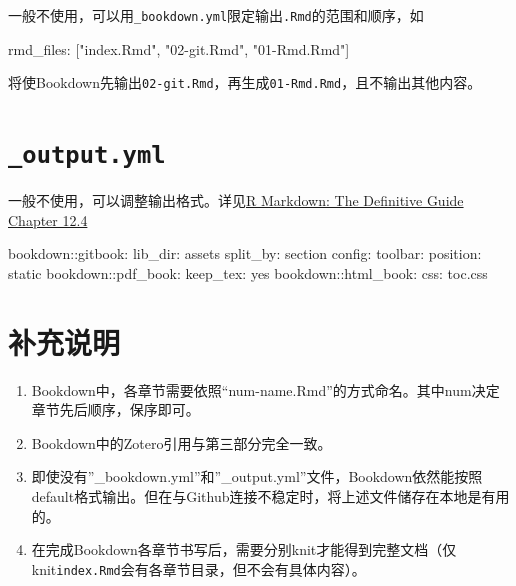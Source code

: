 \documentclass[
  letterpaper,
  DIV=11,
  numbers=noendperiod,
  oneside]{scrreprt}
\newenvironment{Shaded}{}{}
\newcommand{\NormalTok}[1]{\textcolor[rgb]{0.14,0.16,0.18}{#1}}
\newcommand{\SpecialCharTok}[1]{\textcolor[rgb]{0.00,0.36,0.77}{#1}}
\newcommand{\StringTok}[1]{\textcolor[rgb]{0.01,0.18,0.38}{#1}}
\begin{document}
一般不使用，可以用\texttt{\_bookdown.yml}限定输出\texttt{.Rmd}的范围和顺序，如

\begin{Shaded}
\begin{Highlighting}[]

\NormalTok{rmd\_files}\SpecialCharTok{:}\NormalTok{ [}\StringTok{"index.Rmd"}\NormalTok{, }\StringTok{"02{-}git.Rmd"}\NormalTok{, }\StringTok{"01{-}Rmd.Rmd"}\NormalTok{]}
\end{Highlighting}
\end{Shaded}

将使Bookdown先输出\texttt{02-git.Rmd}，再生成\texttt{01-Rmd.Rmd}，且不输出其他内容。

\hypertarget{output.yml}{%
\section{\texorpdfstring{\texttt{\_output.yml}}{\_output.yml}}\label{output.yml}}

一般不使用，可以调整输出格式。详见\href{https://bookdown.org/yihui/rmarkdown/bookdown-output.html}{R
Markdown: The Definitive Guide Chapter 12.4}

\begin{Shaded}
\begin{Highlighting}[]
\NormalTok{bookdown}\SpecialCharTok{::}\NormalTok{gitbook}\SpecialCharTok{:}
\NormalTok{  lib\_dir}\SpecialCharTok{:}\NormalTok{ assets}
\NormalTok{  split\_by}\SpecialCharTok{:}\NormalTok{ section}
\NormalTok{  config}\SpecialCharTok{:}
\NormalTok{    toolbar}\SpecialCharTok{:}
\NormalTok{      position}\SpecialCharTok{:}\NormalTok{ static}
\NormalTok{bookdown}\SpecialCharTok{::}\NormalTok{pdf\_book}\SpecialCharTok{:}
\NormalTok{  keep\_tex}\SpecialCharTok{:}\NormalTok{ yes}
\NormalTok{bookdown}\SpecialCharTok{::}\NormalTok{html\_book}\SpecialCharTok{:}
\NormalTok{  css}\SpecialCharTok{:}\NormalTok{ toc.css}
\end{Highlighting}
\end{Shaded}

\hypertarget{ux8865ux5145ux8bf4ux660e}{%
\section{补充说明}\label{ux8865ux5145ux8bf4ux660e}}

\begin{enumerate}
\def\labelenumi{\arabic{enumi}.}
\item
  Bookdown中，各章节需要依照``num-name.Rmd''的方式命名。其中num决定章节先后顺序，保序即可。
\item
  Bookdown中的Zotero引用与第三部分完全一致。
\item
  即使没有''\_bookdown.yml''和''\_output.yml''文件，Bookdown依然能按照default格式输出。但在与Github连接不稳定时，将上述文件储存在本地是有用的。
\item
  在完成Bookdown各章节书写后，需要分别knit才能得到完整文档（仅knit\texttt{index.Rmd}会有各章节目录，但不会有具体内容）。
\end{enumerate}
\end{document}
